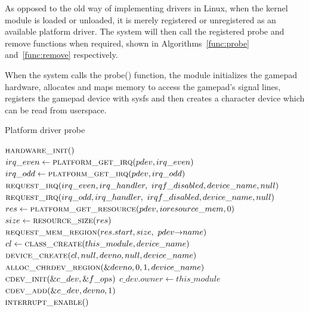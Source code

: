 
As opposed to the old way of implementing drivers in Linux, when the kernel
module is loaded or unloaded, it is merely registered or unregistered as an
available platform driver. The system will then call the registered probe and
remove functions when required, shown in Algorithms~\ref{func:probe}
and~\ref{func:remove} respectively.

When the system calls the probe() function, the module initializes the gamepad
hardware, allocates and maps memory to access the gamepad's signal lines,
registers the gamepad device with sysfs and then creates a character device
which can be read from userspace.

\begin{algorithm}
  \footnotesize
  \caption{Platform driver probe}
  \begin{algorithmic}[1]
      \State $\Call{hardware\_init}{\null}$ \\

      \State $irq\_even \gets \Call{platform\_get\_irq}{pdev, irq\_even}$
      \State $irq\_odd \gets \Call{platform\_get\_irq}{pdev, irq\_odd}$
      \State $\Call{request\_irq}{irq\_even, irq\_handler, \
        irqf\_disabled, device\_name, null}$
      \State $\Call{request\_irq}{irq\_odd, irq\_handler, \
        irqf\_disabled, device\_name, null}$ \\

      \State $res \gets \Call{platform\_get\_resource}{pdev,
        ioresource\_mem, 0}$
      \State $size \gets \Call{resource\_size}{res}$
      \State $\Call{request\_mem\_region}{res.start,  size, \
        pdev{\rightarrow}name}$ \\

      \State $cl \gets \Call{class\_create}{this\_module, device\_name}$
      \State $\Call{device\_create}{cl, null, devno, null, device\_name}$ \\

      \State $\Call{alloc\_chrdev\_region}{\&devno, 0, 1, device\_name}$ \\
      \State $\Call{cdev\_init}{\&c\_dev, \&f\_ops}$
      \State $c\_dev.owner \gets this\_module$
      \State $\Call{cdev\_add}{\&c\_dev, devno, 1}$ \\

      \State $\Call{interrupt\_enable}{\null}$
    \EndFunction
  \end{algorithmic}
  \label{func:probe}
\end{algorithm}

